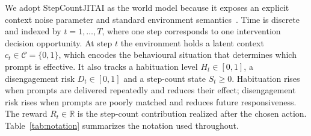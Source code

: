 \documentclass[journal]{IEEEtran}
\begin{document}
We adopt StepCountJITAI as the world model because it exposes an explicit context noise parameter and standard environment semantics~\cite{karine2024stepcount,towers2024gymnasium}.
Time is discrete and indexed by \(t=1,\dots,T\), where one step corresponds to one intervention decision opportunity.
At step \(t\) the environment holds a latent context \(c_t\in\mathcal{C}=\{0,1\}\), which encodes the behavioural situation that determines which prompt is effective.
It also tracks a habituation level \(H_t\in[0,1]\), a disengagement risk \(D_t\in[0,1]\) and a step-count state \(S_t\ge 0\).
Habituation rises when prompts are delivered repeatedly and reduces their effect; disengagement risk rises when prompts are poorly matched and reduces future responsiveness.
The reward \(R_t\in\mathbb{R}\) is the step-count contribution realized after the chosen action.
Table~\ref{tab:notation} summarizes the notation used throughout.
\end{document}
